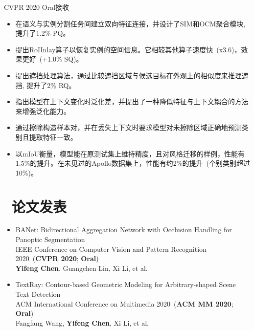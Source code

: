 \documentclass{resume}
\begin{document}
	 {CVPR 2020 Oral接收}
	\vspace{-0.5em}
	\begin{itemize}
		\item 在语义与实例分割任务间建立双向特征连接，并设计了SIM和OCM聚合模块, 提升了1.2\% PQ。
		\item 提出RoIInlay算子以恢复实例的空间信息。它相较其他算子速度快~(x3.6)，效果更好~(+1.0\% SQ)。
		\item 提出遮挡处理算法，通过比较遮挡区域与候选目标在外观上的相似度来推理遮挡, 提升了2\% RQ。
	\end{itemize}
	
	 {}
	\vspace{-0.5em}
	\begin{itemize}
		\item 指出模型在上下文变化时泛化差，并提出了一种降低特征与上下文耦合的方法来增强泛化能力。
		\item 通过擦除构造样本对，并在丢失上下文时要求模型对未擦除区域正确地预测类别且提取特征一致。
		\item 以mIoU衡量，模型能在原测试集上维持精度，且对风格迁移的样例，性能有1.5\%的提升。在未见过的Apollo数据集上，性能有约2\%的提升~(个别类别超过10\%)。
	\end{itemize}
	
	\section{\faFileTextO\ 论文发表}
	\begin{itemize}
		\item BANet: Bidirectional Aggregation Network with Occlusion Handling for Panoptic Segmentation \\
		IEEE Conference on Computer Vision and Pattern Recognition 2020~(\textbf{CVPR 2020}; \textbf{Oral}) \\
		\textbf{Yifeng Chen}, Guangchen Lin, Xi Li, et al. 
		\item TextRay: Contour-based Geometric Modeling for Arbitrary-shaped Scene Text Detection \\
		ACM International Conference on Multimedia 2020~(\textbf{ACM MM 2020}; \textbf{Oral})\\
		Fangfang Wang, \textbf{Yifeng Chen}, Xi Li, et al. 
	\end{itemize}
	\vspace{-0.5em}	
\end{document}
